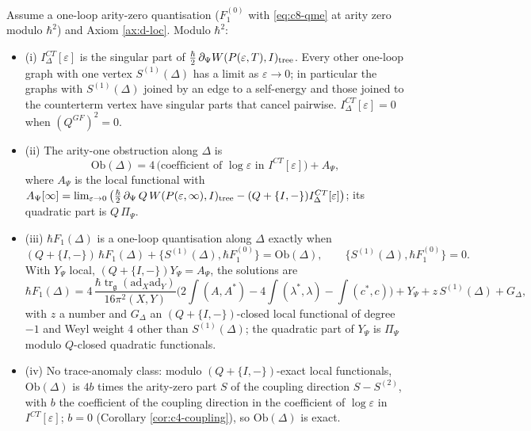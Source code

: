 \begin{theorem}
\label{thm:d-D2}
Assume a one-loop arity-zero quantisation ($F_1^{(0)}$ with \eqref{eq:c8-qme} at arity zero modulo $\hbar^2$) and Axiom \ref{ax:d-loc}. Modulo $\hbar^2$:
\begin{itemize}
\item (i) $I^{CT}_\Delta[\varepsilon]$ is the singular part of $\tfrac\hbar2\,\partial_\Psi W(P(\varepsilon,T),I)_{\rm tree}$. Every other one-loop graph with one vertex $S^{(1)}(\Delta)$ has a limit as $\varepsilon\to0$; in particular the graphs with $S^{(1)}(\Delta)$ joined by an edge to a self-energy and those joined to the counterterm vertex have singular parts that cancel pairwise. $I^{CT}_\Delta[\varepsilon]=0$ when $(Q^{GF})^2=0$.
\item (ii) The arity-one obstruction along $\Delta$ is
\begin{equation}
\mathrm{Ob}(\Delta)=4\,\big(\text{coefficient of }\log\varepsilon\text{ in }I^{CT}[\varepsilon]\big)+A_\Psi,
\label{eq:d-Ob}
\end{equation}
where $A_\Psi$ is the local functional with $A_\Psi[\infty]=\lim_{\varepsilon\to0}\big(\tfrac\hbar2\,\partial_\Psi\,Q\,W(P(\varepsilon,\infty),I)_{\rm tree}-(Q+\{I,-\})I^{CT}_\Delta[\varepsilon]\big)$; its quadratic part is $Q\,\Pi_\Psi$.
\item (iii) $\hbar F_1(\Delta)$ is a one-loop quantisation along $\Delta$ exactly when
\begin{equation}
(Q+\{I,-\})\,\hbar F_1(\Delta)+\{S^{(1)}(\Delta),\hbar F_1^{(0)}\}=\mathrm{Ob}(\Delta),\qquad \{S^{(1)}(\Delta),\hbar F_1^{(0)}\}=0 .
\label{eq:d-F}
\end{equation}
With $Y_\Psi$ local, $(Q+\{I,-\})Y_\Psi=A_\Psi$, the solutions are
\begin{equation}
\hbar F_1(\Delta)=4\,\frac{\hbar\operatorname{tr}_{\mathfrak g}(\mathrm{ad}_X\mathrm{ad}_Y)}{16\pi^2(X,Y)}\Big(2\int(A,A^*)-4\int(\lambda^*,\lambda)-\int(c^*,c)\Big)+Y_\Psi+z\,S^{(1)}(\Delta)+G_\Delta,
\label{eq:d-Fsol}
\end{equation}
with $z$ a number and $G_\Delta$ an $(Q+\{I,-\})$-closed local functional of degree $-1$ and Weyl weight $4$ other than $S^{(1)}(\Delta)$; the quadratic part of $Y_\Psi$ is $\Pi_\Psi$ modulo $Q$-closed quadratic functionals.
\item (iv) No trace-anomaly class: modulo $(Q+\{I,-\})$-exact local functionals, $\mathrm{Ob}(\Delta)$ is $4b$ times the arity-zero part $S$ of the coupling direction $S-S^{(2)}$, with $b$ the coefficient of the coupling direction in the coefficient of $\log\varepsilon$ in $I^{CT}[\varepsilon]$; $b=0$ (Corollary \ref{cor:c4-coupling}), so $\mathrm{Ob}(\Delta)$ is exact.
\end{itemize}
\end{theorem}

